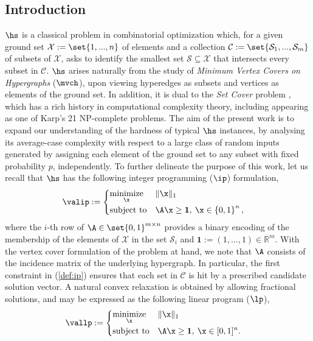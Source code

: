 \subsection{Introduction}\label{sec:intro}

$\hs$ is a classical problem in combinatorial optimization which, for a given ground set $\mathcal{X}:=\set{1,...,n}$ of elements and a collection $\mathcal{C} := \set{\mathcal{S}_1,...,\mathcal{S}_m}$ of subsets of $\mathcal{X}$, asks to identify the smallest set $\mathcal{S}\subseteq \mathcal{X}$ that intersects every subset in $\mathcal{C}$. 
$\hs$ arises naturally from the study of \emph{Minimum Vertex Covers on Hypergraphs} ($\mvch$), upon viewing hyperedges as subsets and vertices as elements of the ground set. 
In addition, it is dual to the \emph{Set Cover} problem \cite{paschos1997survey}, which has a rich history in computational complexity theory, including appearing as one of Karp's 21 NP-complete problems. The aim of the present work is to expand our understanding of the hardness of typical $\hs$ instances, by analysing its average-case complexity with respect to a large class of random inputs generated by assigning each element of the ground set to any subset with fixed probability $p$, independently. To further delineate the purpose of this work, let us recall that $\hs$ has the following integer programming ($\ip$) formulation,
\begin{equation}
\label{def:ip}
\valip:=  
\begin{cases}
\begin{aligned}
& \underset{\x}{\text{minimize}}
& & \|\x\|_1 \\
& \text{subject to}
& &  \A\x \geq \mathbf{1} , \: \x \in \left \{0,1\right\}^n,
\end{aligned}
\end{cases}
\end{equation}
where the $i$-th row of $\A \in \set{0,1}^{m\times n}$ provides a binary encoding of the membership of the elements of $\mathcal{X}$ in the set $\mathcal{S}_i$ and $\mathbf{1} := (1, \ldots, 1) \in \mathbb{R}^m$. With the vertex cover formulation of the problem at hand, we note that $\A$ consists of the incidence matrix of the underlying hypergraph.
In particular, the first constraint in (\ref{def:ip}) ensures that each set in $\mathcal{C}$ is hit by a prescribed candidate solution vector. A natural convex relaxation is obtained by allowing fractional solutions, and may be expressed as the following linear program ($\lp$),
\begin{equation}
\label{def:lp}
\vallp:=
\begin{cases}
\begin{aligned}
& \underset{\x}{\text{minimize}}
& & \|\x\|_1 \\
& \text{subject to}
& & \A\x \geq \mathbf{1}, \:  \x \in [0,1]^n.
\end{aligned}
\end{cases}
\end{equation}

